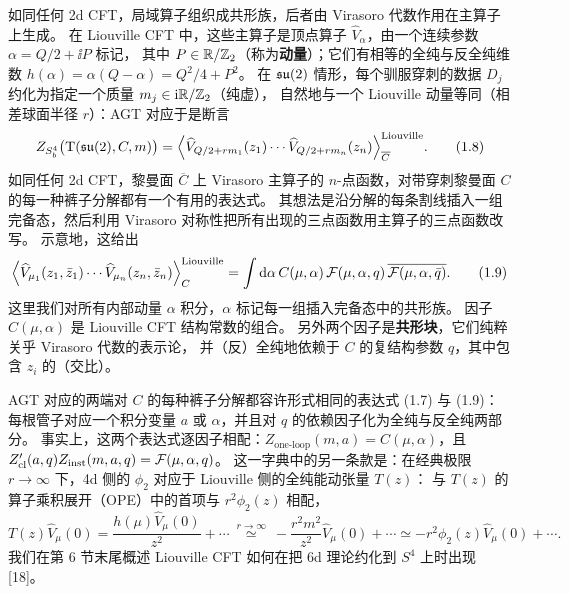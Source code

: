 如同任何 2d CFT，局域算子组织成共形族，后者由 Virasoro 代数作用在主算子上生成。
在 Liouville CFT 中，这些主算子是顶点算子 $\widehat{V}_\alpha$，由一个连续参数 $\alpha=Q/2+\ii P$ 标记，
其中 $P\in\mathbb{R}/\mathbb{Z}_2$（称为\textbf{动量}）；它们有相等的全纯与反全纯维数
$h(\alpha)=\alpha(Q-\alpha)=Q^2/4+P^2$。
在 $\mathfrak{su}(2)$ 情形，每个驯服穿刺的数据 $D_j$ 约化为指定一个质量 $m_j\in\mathrm{i}\mathbb{R}/\mathbb{Z}_2$（纯虚），
自然地与一个 Liouville 动量等同（相差球面半径 $r$）：AGT 对应于是断言
\begin{equation}
  Z_{S^4_b}\bigl(\mathrm{T}(\mathfrak{su}(2),C,m)\bigr)
  =\Bigl\langle \widehat{V}_{Q/2+rm_1}(z_1)\cdots \widehat{V}_{Q/2+rm_n}(z_n)\Bigr\rangle_{\overline{C}}^{\mathrm{Liouville}}.
  \tag{1.8}
\end{equation}
如同任何 2d CFT，黎曼面 $\overline{C}$ 上 Virasoro 主算子的 $n$-点函数，对带穿刺黎曼面 $C$ 的每一种裤子分解都有一个有用的表达式。
其想法是沿分解的每条割线插入一组完备态，然后利用 Virasoro 对称性把所有出现的三点函数用主算子的三点函数改写。
示意地，这给出
\begin{equation}
  \Bigl\langle \widehat{V}_{\mu_1}(z_1,\bar z_1)\cdots \widehat{V}_{\mu_n}(z_n,\bar z_n)\Bigr\rangle_{C}^{\mathrm{Liouville}}
  =\int \mathrm{d} \alpha\, C(\mu,\alpha)\,\mathcal{F}(\mu,\alpha,q)\,\overline{\mathcal{F}(\mu,\alpha,\bar q)}.
  \tag{1.9}
\end{equation}
这里我们对所有内部动量 $\alpha$ 积分，$\alpha$ 标记每一组插入完备态中的共形族。
因子 $C(\mu,\alpha)$ 是 Liouville CFT 结构常数的组合。
另外两个因子是\textbf{共形块}，它们纯粹关乎 Virasoro 代数的表示论，
并（反）全纯地依赖于 $C$ 的复结构参数 $q$，其中包含 $z_i$ 的（交比）。

AGT 对应的两端对 $C$ 的每种裤子分解都容许形式相同的表达式 (1.7) 与 (1.9)：
每根管子对应一个积分变量 $a$ 或 $\alpha$，并且对 $q$ 的依赖因子化为全纯与反全纯两部分。
事实上，这两个表达式逐因子相配：$Z_{\mathrm{one\text{-}loop}}(m,a)=C(\mu,\alpha)$，且
$Z_{\mathrm{cl}}'(a,q)Z_{\mathrm{inst}}(m,a,q)=\mathcal{F}(\mu,\alpha,q)$。
这一字典中的另一条款是：在经典极限 $r\to\infty$ 下，4d 侧的 $\phi_2$ 对应于 Liouville 侧的全纯能动张量 $T(z)$：
与 $T(z)$ 的算子乘积展开（OPE）中的首项与 $r^2\phi_2(z)$ 相配，
\begin{equation}
  T(z)\widehat{V}_\mu(0)=\frac{h(\mu)\widehat{V}_\mu(0)}{z^2}+\cdots
  \ \overset{r\to\infty}{\simeq}\ -\frac{r^2m^2}{z^2}\widehat{V}_\mu(0)+\cdots
  \simeq -r^2\phi_2(z)\widehat{V}_\mu(0)+\cdots.
  \tag{1.10}
\end{equation}
我们在第 6 节末尾概述 Liouville CFT 如何在把 6d 理论约化到 $S^4$ 上时出现 [18]。

